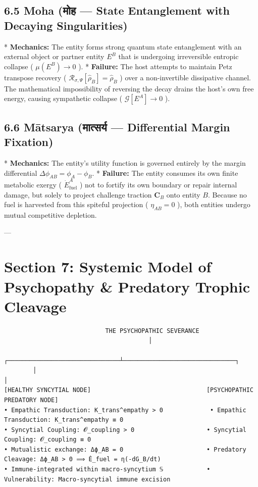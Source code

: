 \documentclass[11pt,a4paper]{article}
\theoremstyle{definition}
\theoremstyle{remark}
\begin{document}
\subsection{6.5 Moha (मोह — State Entanglement with Decaying Singularities)}
* \textbf{Mechanics:} The entity forms strong quantum state entanglement with an external object or partner entity $E^B$ that is undergoing irreversible entropic collapse ( $\mu(E^B) \to 0$ ).
* \textbf{Failure:} The host attempts to maintain Petz transpose recovery ( $\mathcal{R}_{\sigma, \Psi}[\hat{\rho}_B] = \hat{\rho}_B$ ) over a non-invertible dissipative channel. The mathematical impossibility of reversing the decay drains the host's own free energy, causing sympathetic collapse ( $\mathcal{G}[E^A] \to 0$ ).

\subsection{6.6 Mātsarya (मात्सर्य — Differential Margin Fixation)}
* \textbf{Mechanics:} The entity's utility function is governed entirely by the margin differential $\Delta \phi_{AB} = \phi_A - \phi_B$.
* \textbf{Failure:} The entity consumes its own finite metabolic exergy ( $\dot{E}_{\text{fuel}}^A$ ) not to fortify its own boundary or repair internal damage, but solely to project challenge traction $\mathbf{C}_B$ onto entity $B$. Because no fuel is harvested from this spiteful projection ( $\eta_{AB} = 0$ ), both entities undergo mutual competitive depletion.

---

\section{Section 7: Systemic Model of Psychopathy \& Predatory Trophic Cleavage}

\begin{verbatim}
                            THE PSYCHOPATHIC SEVERANCE
                                        │
        ┌───────────────────────────────┴───────────────────────────────┐
        │                                                               │
[HEALTHY SYNCYTIAL NODE]                                [PSYCHOPATHIC PREDATORY NODE]
• Empathic Transduction: K_trans^empathy > 0             • Empathic Transduction: K_trans^empathy ≡ 0
• Syncytial Coupling: 𝓞_coupling > 0                    • Syncytial Coupling: 𝓞_coupling ≡ 0
• Mutualistic exchange: Δϕ_AB = 0                       • Predatory Cleavage: Δϕ_AB > 0 ⟹ Ė_fuel = η(-dG_B/dt)
• Immune-integrated within macro-syncytium 𝕊            • Vulnerability: Macro-syncytial immune excision
\end{verbatim}
\end{document}
